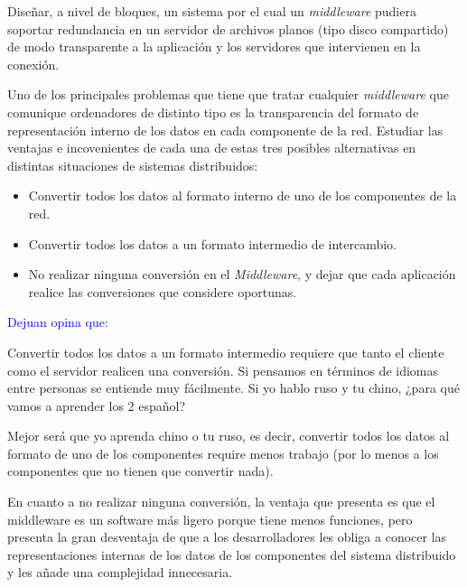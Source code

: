 
  \begin{problem}[1]
  Diseñar, a nivel de bloques, un sistema por el cual un \textit{middleware} pudiera soportar redundancia en un servidor de archivos planos (tipo disco
  compartido) de modo transparente a la aplicación y los servidores
  que intervienen en la conexión.


  \solution



  \end{problem}

  \begin{problem}[2]
  Uno de los principales problemas que tiene que tratar cualquier
\textit{middleware} que comunique ordenadores de distinto tipo es la transparencia del formato
  de representación interno de los datos en cada componente de la
  red. Estudiar las ventajas e incovenientes de cada una de estas tres posibles
  alternativas en distintas situaciones de sistemas distribuidos:
    \begin{itemize}
    \item Convertir todos los datos al formato interno de uno de los componentes
    de la red.
    \item Convertir todos los datos a un formato intermedio de intercambio.
    \item No realizar ninguna conversión en el \textit{Middleware}, y dejar que cada
aplicación realice las conversiones que considere oportunas.
\end{itemize}
    \solution
\textcolor{blue}{Dejuan opina que:}

Convertir todos los datos a un formato intermedio requiere que tanto el cliente como el servidor realicen una conversión. Si pensamos en términos de idiomas entre personas se entiende muy fácilmente. Si yo hablo ruso y tu chino, ¿para qué vamos a aprender los 2 español?

Mejor será que yo aprenda chino o tu ruso, es decir, convertir todos los datos al formato de uno de los componentes require menos trabajo (por lo menos a los componentes que no tienen que convertir nada).

En cuanto a no realizar ninguna conversión, la ventaja que presenta es que el middleware es un software más ligero porque tiene menos funciones, pero presenta la gran desventaja de que a los desarrolladores les obliga a conocer las representaciones internas de los datos de los componentes del sistema distribuido y les añade una complejidad innecesaria.

    \end{problem}

